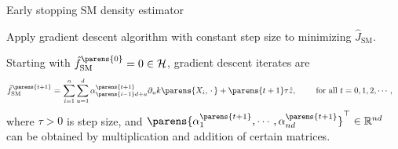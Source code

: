 \documentclass[aspectratio=169,xcolor=dvipsnames]{beamer}
\newcommand{\SM}{\mathrm{SM}}
\begin{document}
\begin{frame}{Early stopping SM density estimator}
	
	Apply gradient descent algorithm with constant step size to minimizing $\widehat{J}_{\SM}$. 
	
	\vspace{10pt}
	
	
	
	Starting with $\hat{f}_{\SM}^{\parens{0}} = 0 \in \mathcal{H}$, gradient descent iterates are 
	\begin{align*}
		\hat{f}_{\SM}^{\parens{t+1}} %
		= & \, \sum_{i=1}^n \sum_{u=1}^d \alpha_{\parens{i-1}d + u}^{\parens{t+1}} \partial_u k \parens{X_i, \,\cdot\,} + \parens{t + 1} \tau \hat{z}, \qquad \text{ for all } t = 0, 1, 2, \cdots,  %
	\end{align*}
	where $\tau > 0$ is step size, and $\parens{\alpha_1^{\parens{t+1}}, \cdots, \alpha_{nd}^{\parens{t+1}}}^\top \in \mathbb{R}^{nd}$ can be obtained by multiplication and addition of certain matrices. 
	
%	
	
	
	
\end{frame}
\end{document}
